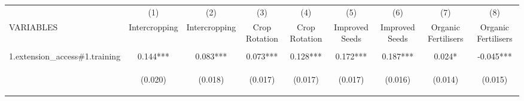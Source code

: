 \begin{center}
\begin{tabular}{lcccccccc} \hline
 & (1) & (2) & (3) & (4) & (5) & (6) & (7) & (8) \\
VARIABLES & Intercropping & Intercropping & Crop Rotation & Crop Rotation & Improved Seeds & Improved Seeds & Organic Fertilisers & Organic Fertilisers \\ \hline
\vspace{4pt} & \begin{footnotesize}\end{footnotesize} & \begin{footnotesize}\end{footnotesize} & \begin{footnotesize}\end{footnotesize} & \begin{footnotesize}\end{footnotesize} & \begin{footnotesize}\end{footnotesize} & \begin{footnotesize}\end{footnotesize} & \begin{footnotesize}\end{footnotesize} & \begin{footnotesize}\end{footnotesize} \\
1.extension\_access\#1.training & 0.144*** & 0.083*** & 0.073*** & 0.128*** & 0.172*** & 0.187*** & 0.024* & -0.045*** \\
\vspace{4pt} & \begin{footnotesize}(0.020)\end{footnotesize} & \begin{footnotesize}(0.018)\end{footnotesize} & \begin{footnotesize}(0.017)\end{footnotesize} & \begin{footnotesize}(0.017)\end{footnotesize} & \begin{footnotesize}(0.017)\end{footnotesize} & \begin{footnotesize}(0.016)\end{footnotesize} & \begin{footnotesize}(0.014)\end{footnotesize} & \begin{footnotesize}(0.015)\end{footnotesize} \\

\end{tabular}
\end{center}
